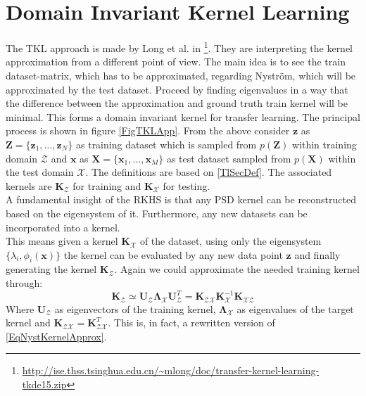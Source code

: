 \section{Domain Invariant Kernel Learning}\label{InSecTrans}
The \ac{TKL} approach is made by Long et al. in  \cite{Long.2015}\footnote{\url{http://ise.thss.tsinghua.edu.cn/~mlong/doc/transfer-kernel-learning-tkde15.zip}}.
They are interpreting the kernel approximation from a different point of view.
The main idea is to see the train dataset-matrix, which has to be approximated, regarding Nyström, which will be approximated by the test dataset. Proceed by finding eigenvalues in a way that the difference between the approximation and ground truth train kernel will be minimal. This forms a domain invariant kernel for transfer learning.\cite{Long.2015}
The principal process is shown in figure \ref{FigTKLApp}.\newline 
From the above consider $\mathbf{z}$ as $\mathbf{Z}=\{\mathbf{z}_1,\dots,\mathbf{z}_{N}\}$ as training dataset which is sampled from $p(\mathbf{Z})$ within training domain $\mathcal{Z}$ and $\mathbf{x}$ as $\mathbf{X}=\{\mathbf{x}_1,\dots,\mathbf{x}_{M}\}$ as test dataset sampled from $p(\mathbf{X})$ within the test domain $\mathcal{X}$.
The definitions are based on \ref{TlSecDef}.
The associated kernels are $\mathbf{K}_\mathcal{Z}$ for training and $\mathbf{K}_\mathcal{X}$ for testing.\\
A fundamental insight of the \acs{RKHS} is that any \ac{PSD} kernel can be reconstructed based on the eigensystem of it. Furthermore, any new datasets can be incorporated into a kernel.\cite{Long.2015}\\
This means given a kernel $\mathbf{K}_\mathcal{X}$ of the dataset, using only the eigensystem $\{\lambda_i,\phi_i(\mathbf{x})\}$ the kernel can be evaluated by any new data point $\mathbf{z}$ and finally generating the kernel $\mathbf{K}_\mathcal{Z}$.
Again we could approximate the needed training kernel through:\cite{Long.2015}
\begin{equation}\label{EqTrainTestApprox}
	\mathbf{K}_\mathcal{Z} \simeq \mathbf{U}_\mathcal{Z}\boldsymbol{\Lambda}_\mathcal{X} \mathbf{U}_\mathcal{Z}^T = \mathbf{K}_\mathcal{ZX}\mathbf{K}_\mathcal{X}^{-1}\mathbf{K}_\mathcal{XZ}
\end{equation}
Where $\mathbf{U}_\mathcal{Z}$ as eigenvectors of the training kernel, $\boldsymbol{\Lambda}_\mathcal{X}$ as eigenvalues of the target kernel and $\mathbf{K}_\mathcal{ZX} = \mathbf{K}_\mathcal{ZX}^T$.
This is, in fact, a rewritten version of \eqref{EqNystKernelApprox}.\\

